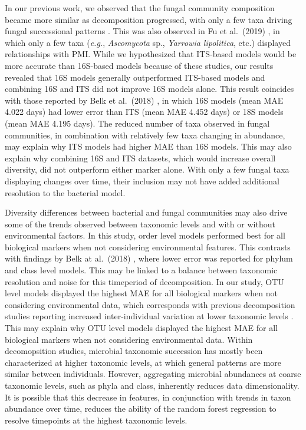 \documentclass[
  10pt,
  letterpaper,
]{article}
\begin{document}
In our previous work, we observed that the fungal community composition
became more similar as decomposition progressed, with only a few taxa
driving fungal successional patterns \citep{mason_body_2022}. This was
also observed in Fu et al.~(2019) \citep{fu_fungal_2019}, in which only
a few taxa (\emph{e.g.}, \emph{Ascomycota} sp., \emph{Yarrowia
lipolitica}, etc.) displayed relationships with PMI. While we
hypothesized that ITS-based models would be more accurate than 16S-based
models because of these studies, our results revealed that 16S models
generally outperformed ITS-based models and combining 16S and ITS did
not improve 16S models alone. This result coincides with those reported
by Belk et al.~(2018) \citep{belk_microbiome_2018}, in which 16S models
(mean MAE 4.022 days) had lower error than ITS (mean MAE 4.452 days) or
18S models (mean MAE 4.195 days). The reduced number of taxa observed in
fungal communities, in combination with relatively few taxa changing in
abundance, may explain why ITS models had higher MAE than 16S models.
This may also explain why combining 16S and ITS datasets, which would
increase overall diversity, did not outperform either marker alone. With
only a few fungal taxa displaying changes over time, their inclusion may
not have added additional resolution to the bacterial model.

Diversity differences between bacterial and fungal communities may also
drive some of the trends observed between taxonomic levels and with or
without environmental factors. In this study, order level models
performed best for all biological markers when not considering
environmental features. This contrasts with findings by Belk at
al.~(2018) \citep{belk_microbiome_2018}, where lower error was reported
for phylum and class level models. This may be linked to a balance
between taxonomic resolution and noise for this timeperiod of
decomposition. In our study, OTU level models displayed the highest MAE
for all biological markers when not considering environmental data,
which corresponds with previous decomposition studies reporting
increased inter-individual variation at lower taxonomic levels
\citep{metcalf_microbial_2016, mason_body_2022, taylor_transient_2024}.
This may explain why OTU level models displayed the highest MAE for all
biological markers when not considering environmental data. Within
decomopsition studies, microbial taxonomic succession has mostly been
characterized at higher taxonomic levels, at which general patterns are
more similar between individuals. However, aggregating microbial
abundances at coarse taxonomic levels, such as phyla and class,
inherently reduces data dimensionality. It is possible that this
decrease in features, in conjunction with trends in taxon abundance over
time, reduces the ability of the random forest regression to resolve
timepoints at the highest taxonomic levels.
\end{document}

